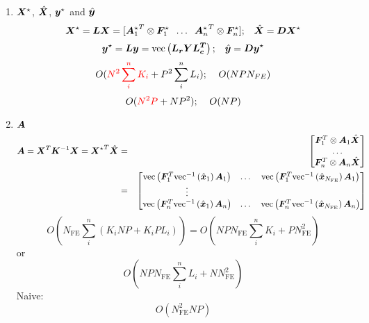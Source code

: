 \documentclass[10pt]{scrartcl}
\begin{document}
\begin{enumerate}

\item{
$\bm{X}^\star$, $\hat{\bm{X}}$, $\bm{y}^\star$ and $\hat{\bm{y}}$
\begin{equation}
\bm{X}^\star = \bm{LX} =
[
{\bm{A}^\star_1}^T\otimes{\bm{F}^\star_1}\;\; \dots \;\;
{\bm{A}^\star_n}^T\otimes{\bm{F}^\star_n}
];\;\;\;\hat{\bm{X}}=\bm{DX}^\star
\end{equation}
\begin{equation}
\bm{y}^\star = \bm{Ly} = \mathrm{vec}\left(\bm{L_rYL_c^T}\right);
\;\;\;\hat{\bm{y}}=\bm{Dy}^\star
\end{equation}
\begin{equation}
O({\color{red} N^2\sum_i^nK_i}+P^2\sum_i^nL_i);\;\;\;\; O(NPN_{FE})
\end{equation}
\begin{equation}
O({\color{red} N^2P}+NP^2);\;\;\;\; O(NP)
\end{equation}
}

\item{
$\bm{A}$
\begin{eqnarray}
\bm{A} = \bm{X}^T\bm{K}^{-1}\bm{X}={\bm{X}^\star}^T\hat{\bm{X}} & = &
\begin{bmatrix}
\bm{F}_1^T\otimes\bm{A}_1 \hat{\bm{X}} \\
\dots \\
\bm{F}_n^T\otimes\bm{A}_n \hat{\bm{X}}
\end{bmatrix}
\\
& = &
\begin{bmatrix}
\mathrm{vec}\left(\bm{F}_1^T\text{vec}^{-1}\left(\hat{\bm{x}}_1\right)\bm{A}_1\right) & \dots & \mathrm{vec}\left(\bm{F}_1^T\text{vec}^{-1}\left(\hat{\bm{x}}_{N_{\text{FE}}}\right)\bm{A}_1\right)\\
\vdots \\
\mathrm{vec}\left(\bm{F}_n^T\text{vec}^{-1}\left(\hat{\bm{x}}_1\right)\bm{A}_n\right) & \dots &  \mathrm{vec}\left(\bm{F}_n^T\text{vec}^{-1}\left(\hat{\bm{x}}_{N_{\text{FE}}}\right)\bm{A}_n\right)
\end{bmatrix}
\end{eqnarray}
\begin{equation}
O(N_\text{FE}\sum_i^n(K_iNP+K_iPL_i))=O(NPN_\text{FE}\sum_i^nK_i+PN_\text{FE}^2)
\end{equation}
 or 
\begin{equation}
O(NPN_\text{FE}\sum_i^nL_i+NN_\text{FE}^2)
\end{equation}
Naive:
\begin{equation}
O(N_\text{FE}^2NP)
\end{equation}
}


\end{enumerate}
\end{document}
